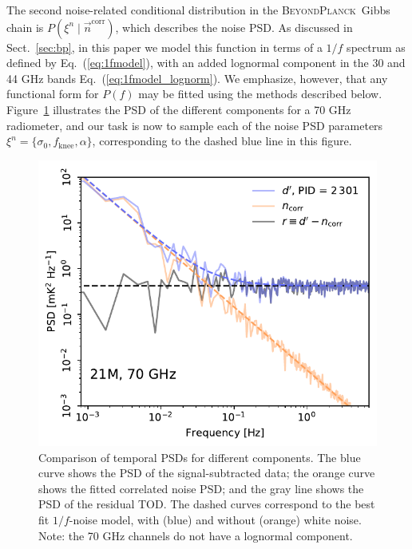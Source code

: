 \documentclass{aa}
\newcommand{\BP}{\textsc{BeyondPlanck}}
\begin{document}
The second noise-related conditional distribution in the \BP\ Gibbs
chain is $P(\xi^n\mid\vec{n}^\mathrm{corr})$, which describes the
noise PSD. As discussed in Sect.~\ref{sec:bp}, in this paper we model
this function in terms of a $1/f$ spectrum as defined by
Eq.~(\ref{eq:1fmodel}), with an added lognormal component in the 30 and 44 GHz bands Eq.~(\ref{eq:1fmodel_lognorm}). 
We emphasize, however, that any functional form for $P(f)$ may be
fitted using the methods described below. Figure~\ref{fig:ps_1f}
illustrates the PSD of the different components for a 70 GHz radiometer, and our task is now
to sample each of the noise PSD parameters $\xi^n = \{\sigma_0,
f_\mathrm{knee}, \alpha\}$, corresponding to the dashed blue line in
this figure.

\begin{figure}
        \begin{center}
                \includegraphics[width=\linewidth]{figs/ps_running_mean_21M.pdf}
        \end{center}
        \caption{Comparison of temporal PSDs for different
          components. The blue curve shows the PSD of the
          signal-subtracted data; the orange curve shows the fitted
          correlated noise PSD; and the gray line shows the PSD of the
          residual TOD. The dashed curves correspond to the best fit
          $1/f$-noise model, with (blue) and without (orange) white
          noise. Note: the 70 GHz channels do not have a 
          lognormal component.}
        \label{fig:ps_1f}
\end{figure}
\end{document}
